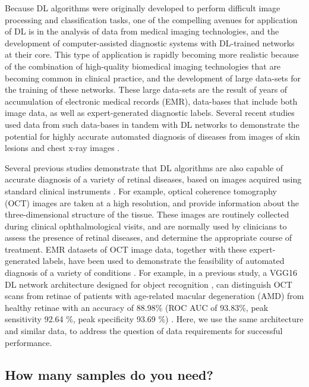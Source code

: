 Because DL algorithms were originally developed to perform difficult image
processing and classification tasks, one of the compelling avenues for
application of DL is in the analysis of data from medical imaging technologies,
and the development of computer-assisted diagnostic systems with DL-trained
networks at their core. This type of application is rapidly becoming more
realistic because of the combination of high-quality biomedical imaging
technologies that are becoming common in clinical practice, and the development
of large data-sets for the training of these networks. These large data-sets are
the result of years of accumulation of electronic medical records (EMR),
data-bases that include both image data, as well as expert-generated diagnostic
labels. Several recent studies used data from such data-bases in tandem with DL
networks to demonstrate the potential for highly accurate automated diagnosis of
diseases from images of skin lesions \citep{Esteva2017-ho} and chest x-ray
images \citep{Rajpurkar2017-mv}.

Several previous studies demonstrate that DL algorithms are also capable of
accurate diagnosis of a variety of retinal diseases, based on images acquired
using standard clinical instruments \citep{Gulshan2016-fh}. For example,
optical coherence tomography (OCT) images are taken at a high resolution, and
provide information about the three-dimensional structure of the tissue. These
images are routinely collected during clinical ophthalmological visits, and are
normally used by clinicians to assess the presence of retinal diseases, and
determine the appropriate course of treatment. EMR datasets of OCT image data,
together with these expert-generated labels, have been used to demonstrate the
feasibility of automated diagnosis of a variety of conditions
\citep{Gulshan2016-fh, lee2017deep, Lee2017-vp, Awais2017-qw, Kermany2018-bq}.
For example, in a previous study, a VGG16 DL network architecture designed for
object recognition \citep{Simonyan2014-al}, can distinguish OCT scans from
retinae of patients with age-related macular degeneration (AMD) from healthy
retinae with an accuracy of 88.98\% (ROC AUC of 93.83\%, peak sensitivity 92.64
\%, peak specificity 93.69 \%) \citep{lee2017deep}. Here, we use the same
architecture and similar data, to address the question of data requirements for
successful performance.

\subsection{How many samples do you need?}

